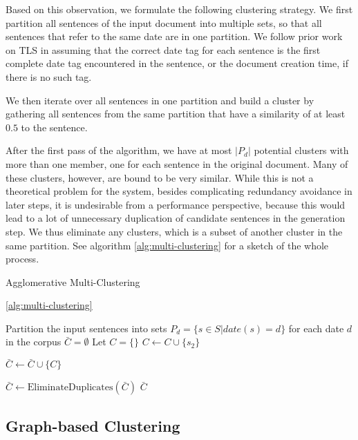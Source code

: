 \documentclass[a4paper,BCOR=10mm]{report}
\begin{document}
Based on this observation, we formulate the following clustering strategy. We first partition all sentences of the input document into multiple sets, so that all sentences that refer to the same date are in one partition. We follow prior work on TLS in assuming that the correct date tag for each sentence is the first complete date tag encountered in the sentence, or the document creation time, if there is no such tag.

We then iterate over all sentences in one partition and build a cluster by gathering all sentences from the same partition that have a similarity of at least $0.5$ to the sentence.

After the first pass of the algorithm, we have at most $|P_d|$ potential clusters with more than one member, one for each sentence in the original document.
Many of these clusters, however, are bound to be very similar. While this is not a theoretical problem for the system, besides complicating redundancy avoidance in later steps, it is undesirable from a performance perspective, because this would lead to a lot of unnecessary duplication of candidate sentences in the generation step.
We thus eliminate any clusters, which is a subset of another cluster in the same partition. See algorithm \ref{alg:multi-clustering} for a sketch of the whole process.


 \begin{algorithm}
 \caption{Agglomerative Multi-Clustering}
 \ref{alg:multi-clustering}
 \begin{algorithmic}
    \STATE Partition the input sentences into sets $P_d = \{ s \in S | date(s) = d \}$ for each date $d$ in the corpus
    \STATE $\bar{C} = \emptyset$
            \STATE Let $C = \{  \}$
                    \STATE $C \leftarrow C \cup \{ s_2 \}$
                \ENDIF
            \ENDFOR

                \STATE $\bar{C} \leftarrow \bar{C} \cup \{ C \}$
            \ENDIF
        \ENDFOR

    \ENDFOR
    \STATE $\bar{C} \leftarrow \text{EliminateDuplicates}(\bar{C})$
    \RETURN $\bar{C}$

\end{algorithmic}
\end{algorithm}

\subsection{Graph-based Clustering}
\end{document}
